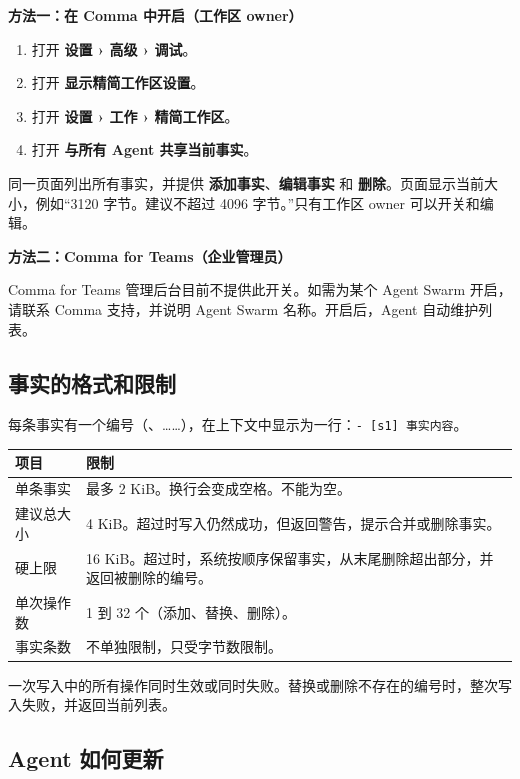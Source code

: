 \documentclass[UTF8,a4paper,11pt]{ctexart}
\begin{document}
\textbf{方法一：在 Comma 中开启（工作区 owner）}

\begin{enumerate}
  \item 打开 \textbf{设置 › 高级 › 调试}。
  \item 打开 \textbf{显示精简工作区设置}。
  \item 打开 \textbf{设置 › 工作 › 精简工作区}。
  \item 打开 \textbf{与所有 Agent 共享当前事实}。
\end{enumerate}

同一页面列出所有事实，并提供 \textbf{添加事实}、\textbf{编辑事实} 和 \textbf{删除}。页面显示当前大小，例如“3120 字节。建议不超过 4096 字节。”只有工作区 owner 可以开关和编辑。

\textbf{方法二：Comma for Teams（企业管理员）}

Comma for Teams 管理后台目前不提供此开关。如需为某个 Agent Swarm 开启，请联系 Comma 支持，并说明 Agent Swarm 名称。开启后，Agent 自动维护列表。

\subsection{事实的格式和限制}

每条事实有一个编号（、……），在上下文中显示为一行：\texttt{- [s1] 事实内容}。

\begin{longtable}{P{4.6cm}P{9.2cm}}
\toprule
项目 & 限制 \\
\midrule
\endhead
单条事实 & 最多 2 KiB。换行会变成空格。不能为空。 \\
建议总大小 & 4 KiB。超过时写入仍然成功，但返回警告，提示合并或删除事实。 \\
硬上限 & 16 KiB。超过时，系统按顺序保留事实，从末尾删除超出部分，并返回被删除的编号。 \\
单次操作数 & 1 到 32 个（添加、替换、删除）。 \\
事实条数 & 不单独限制，只受字节数限制。 \\
\bottomrule
\end{longtable}

一次写入中的所有操作同时生效或同时失败。替换或删除不存在的编号时，整次写入失败，并返回当前列表。

\subsection{Agent 如何更新}
\end{document}
